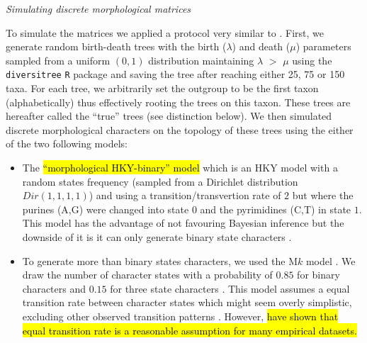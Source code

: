 \documentclass[12pt,letterpaper]{article}
\renewcommand{\subsection}[1]{%
\bigskip
\begin{center}
\begin{large}
\normalfont\itshape #1
\end{large}
\end{center}}
\begin{document}
\subsection{Simulating discrete morphological matrices}
To simulate the matrices we applied a protocol very similar to \cite{Guillerme2016146}.
First, we generate random birth-death trees with the birth ($\lambda$) and death ($\mu$) parameters sampled from a uniform $(0,1)$ distribution maintaining $\lambda$ $>$ $\mu$ using the \texttt{diversitree} \texttt{R} package \citep[v0.9-8;][]{fitzjohndiversitree2012} and saving the tree after reaching either 25, 75 or 150 taxa.
For each tree, we arbitrarily set the outgroup to be the first taxon (alphabetically) thus effectively rooting the trees on this taxon.
These trees are hereafter called the ``true'' trees (see distinction below).
We then simulated discrete morphological characters on the topology of these trees using the either of the two following models:
\begin{itemize}
    \item The \hl{``morphological HKY-binary'' model} \citep{OReilly20160081} which is an HKY model \citep{HKY85} with a random states frequency (sampled from a Dirichlet distribution $Dir(1,1,1,1)$) and using a transition/transvertion rate of $2$ \citep{douadycomparison2003} but where the purines (A,G) were changed into state $0$ and the pyrimidines (C,T) in state $1$.
    This model has the advantage of not favouring Bayesian inference \citep[since it doesn't use an M$k$ model;][; see discussion]{OReilly20160081} but the downside of it is it can only generate binary state characters \citep[or 4 states;][]{puttick2017uncertain}.
    \item To generate more than binary states characters, we used the M$k$ model \citep{lewisa2001}.
    We draw the number of character states with a probability of $0.85$ for binary characters and $0.15$ for three state characters \citep[\hl{from empirical observations in: }][]{Guillerme2016146,ZouConvergence}.
    This model assumes a equal transition rate between character states which might seem overly simplistic, excluding other observed transition patterns \citep[e.g. Dollo characters;][]{Dollo,wright2015came}.
    However, \cite{Wright01072016} \hl{have shown that equal transition rate is a reasonable assumption for many empirical datasets.}
\end{itemize}
\end{document}
